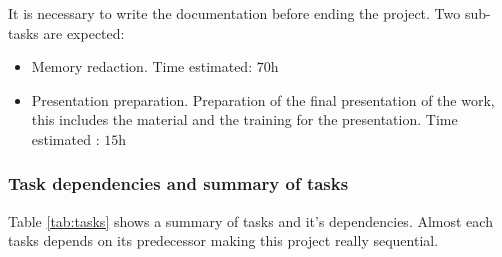 It is necessary to write the documentation before ending the project. Two sub-tasks are expected:
\begin{itemize}
  \item Memory redaction. Time estimated: $\si{70\hour}$
  \item Presentation preparation. Preparation of the final presentation of the work, this includes the material and the training for the presentation. Time estimated : $\si{15\hour}$
\end{itemize}

\subsubsection{Task dependencies and summary of tasks}

Table \ref{tab:tasks} shows a summary of tasks and it's dependencies. Almost each tasks depends on its predecessor making this project really sequential.

